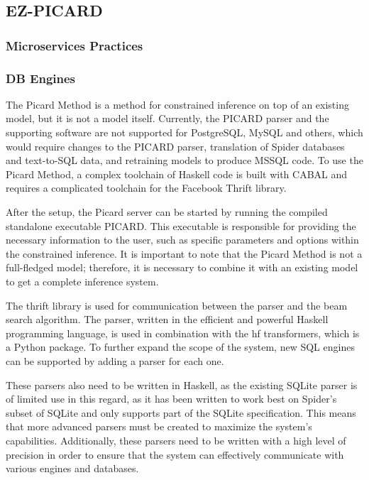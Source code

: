 \subsection{EZ-PICARD}

\subsubsection{Microservices Practices}



\subsubsection{DB Engines}

The Picard Method is a method for constrained inference on top of an existing model, but it is not a model itself. Currently, the PICARD parser and the supporting software are not supported for PostgreSQL, MySQL and others, which would require changes to the PICARD parser, translation of Spider databases and text-to-SQL data, and retraining models to produce MSSQL code. To use the Picard Method, a complex toolchain of Haskell code is built with CABAL and requires a complicated toolchain for the Facebook Thrift library.

After the setup, the Picard server can be started by running the compiled standalone executable PICARD. This executable is responsible for providing the necessary information to the user, such as specific parameters and options within the constrained inference. It is important to note that the Picard Method is not a full-fledged model; therefore, it is necessary to combine it with an existing model to get a complete inference system.

The thrift library is used for communication between the parser and the beam search algorithm. The parser, written in the efficient and powerful Haskell programming language, is used in combination with the hf transformers, which is a Python package. To further expand the scope of the system, new SQL engines can be supported by adding a parser for each one.

These parsers also need to be written in Haskell, as the existing SQLite parser is of limited use in this regard, as it has been written to work best on Spider's subset of SQLite and only supports part of the SQLite specification. This means that more advanced parsers must be created to maximize the system's capabilities. Additionally, these parsers need to be written with a high level of precision in order to ensure that the system can effectively communicate with various engines and databases.